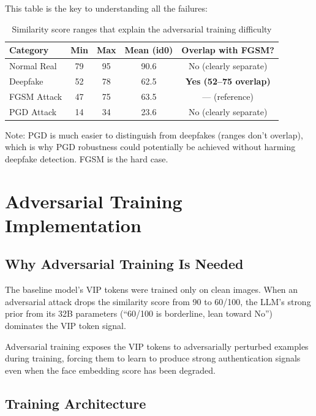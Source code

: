 \documentclass[12pt,a4paper]{article}
\begin{document}
This table is the key to understanding all the failures:

\begin{table}[H]
\centering
\caption{Similarity score ranges that explain the adversarial training difficulty}
\begin{tabular}{@{}lcccc@{}}
\toprule
\textbf{Category} & \textbf{Min} & \textbf{Max} & \textbf{Mean (id0)} & \textbf{Overlap with FGSM?} \\
\midrule
Normal Real  & 79 & 95 & 90.6 & No (clearly separate) \\
Deepfake     & 52 & 78 & 62.5 & \textbf{Yes (52--75 overlap)} \\
FGSM Attack  & 47 & 75 & 63.5 & --- (reference) \\
PGD Attack   & 14 & 34 & 23.6 & No (clearly separate) \\
\bottomrule
\end{tabular}
\end{table}

Note: PGD is much easier to distinguish from deepfakes (ranges don't overlap), which is why PGD robustness could potentially be achieved without harming deepfake detection. FGSM is the hard case.

\section{Adversarial Training Implementation}

\subsection{Why Adversarial Training Is Needed}

The baseline model's VIP tokens were trained only on clean images. When an adversarial attack drops the similarity score from 90 to 60/100, the LLM's strong prior from its 32B parameters (``60/100 is borderline, lean toward No'') dominates the VIP token signal.

Adversarial training exposes the VIP tokens to adversarially perturbed examples during training, forcing them to learn to produce strong authentication signals even when the face embedding score has been degraded.

\subsection{Training Architecture}
\end{document}
